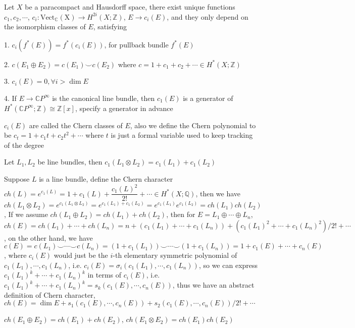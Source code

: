 \documentclass[main]{subfiles}
\begin{document}
\begin{definition}
Let $X$ be a paracompact and Hausdorff space, there exist unique functions $c_1,c_2,\cdots$, $c_i: \mathrm{Vect_{\mathbb C}(X)}\to H^{2i}(X;\mathbb Z)$, $E\to c_i(E)$, and they only depend on the isomorphism classes of $E$, satisfying \par
1. $c_i(f^*(E))=f^*(c_i(E))$, for pullback bundle $f^*(E)$ \par
2. $c(E_1\oplus E_2)=c(E_1)\smile c(E_2)$ where $c=1+c_1+c_2+\cdots\in H^*(X;\mathbb Z)$ \par
3. $c_i(E)=0,\forall i>\dim E$ \par
4. If $E\to \mathbb CP^\infty$ is the canonical line bundle, then $c_1(E)$ is a generator of $H^*(\mathbb CP^\infty;\mathbb Z)\cong\mathbb Z[x]$, specify a generator in advance \par
$c_i(E)$ are called the Chern classes of $E$, also we define the Chern polynomial to be $c_t=1+c_1t+c_2t^2+\cdots$ where $t$ is just a formal variable used to keep tracking of the degree
\end{definition}

\begin{lemma}
Let $L_1,L_2$ be line bundles, then $c_1(L_1\otimes L_2)=c_1(L_1)+c_1(L_2)$
\end{lemma}

\begin{definition}
Suppose $L$ is a line bundle, define the Chern character $ch(L)=e^{c_1(L)}=1+c_1(L)+\dfrac{c_1(L)^2}{2!}+\cdots\in H^*(X;\mathbb Q)$, then we have $ch(L_1\otimes L_2)=e^{c_1(L_1\otimes L_2)}=e^{c_1(L_1)+c_1(L_2)}=e^{c_1(L_1)}e^{c_1(L_2)}=ch(L_1)ch(L_2)$, If we assume $ch(L_1\oplus L_2)=ch(L_1)+ch(L_2)$, then for $E=L_1\oplus\cdots\oplus L_n$, $ch(E)=ch(L_1)+\cdots+ch(L_n)=n+\left(c_1(L_1)+\cdots+c_1(L_n)\right)+\left(c_1(L_1)^2+\cdots+c_1(L_n)^2\right)/2!+\cdots$, on the other hand, we have $c(E)=c(L_1)\smile\cdots\smile c(L_n)=(1+c_1(L_1))\smile\cdots\smile(1+c_1(L_n))=1+c_1(E)+\cdots+c_n(E)$, where $c_i(E)$ would just be the $i$-th elementary symmetric polynomial of $c_1(L_1),\cdots,c_1(L_n)$, i.e. $c_i(E)=\sigma_i(c_1(L_1),\cdots,c_1(L_n))$, so we can express $c_1(L_1)^k+\cdots+c_1(L_n)^k$ in terms of $c_i(E)$, i.e. $c_1(L_1)^k+\cdots+c_1(L_n)^k=s_k(c_1(E),\cdots,c_n(E))$, thus we have an abstract definition of Chern character, $ch(E)=\dim E+s_1(c_1(E),\cdots,c_n(E))+s_2(c_1(E),\cdots,c_n(E))/2!+\cdots$
\end{definition}

\begin{proposition}
$ch(E_1\oplus E_2)=ch(E_1)+ch(E_2)$, $ch(E_1\otimes E_2)=ch(E_1)ch(E_2)$
\end{proposition}
\end{document}
